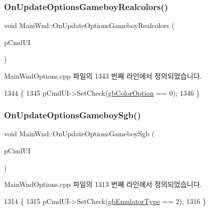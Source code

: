 \subsubsection{\texorpdfstring{On\+Update\+Options\+Gameboy\+Realcolors()}{OnUpdateOptionsGameboyRealcolors()}}
{\footnotesize\ttfamily void Main\+Wnd\+::\+On\+Update\+Options\+Gameboy\+Realcolors (\begin{DoxyParamCaption}\item[{C\+Cmd\+UI $\ast$}]{p\+Cmd\+UI }\end{DoxyParamCaption})\hspace{0.3cm}{\ttfamily [protected]}}



Main\+Wnd\+Options.\+cpp 파일의 1343 번째 라인에서 정의되었습니다.


\begin{DoxyCode}
1344 \{
1345   pCmdUI->SetCheck(\mbox{\hyperlink{gb_globals_8cpp_abb08650d8f653865820da10dc8e59a8b}{gbColorOption}} == 0);  
1346 \}
\end{DoxyCode}
\mbox{\label{class_main_wnd_a7da1fc10502037d014524bac0bdea7c6}} 
\subsubsection{\texorpdfstring{On\+Update\+Options\+Gameboy\+Sgb()}{OnUpdateOptionsGameboySgb()}}
{\footnotesize\ttfamily void Main\+Wnd\+::\+On\+Update\+Options\+Gameboy\+Sgb (\begin{DoxyParamCaption}\item[{C\+Cmd\+UI $\ast$}]{p\+Cmd\+UI }\end{DoxyParamCaption})\hspace{0.3cm}{\ttfamily [protected]}}



Main\+Wnd\+Options.\+cpp 파일의 1313 번째 라인에서 정의되었습니다.


\begin{DoxyCode}
1314 \{
1315   pCmdUI->SetCheck(\mbox{\hyperlink{gb_globals_8cpp_aab449ed6ecf2bd502928a3d5aa5c54c4}{gbEmulatorType}} == 2);
1316 \}
\end{DoxyCode}
\mbox{\label{class_main_wnd_af4ff595c3cbb12ff64dd2f485472740c}} 
